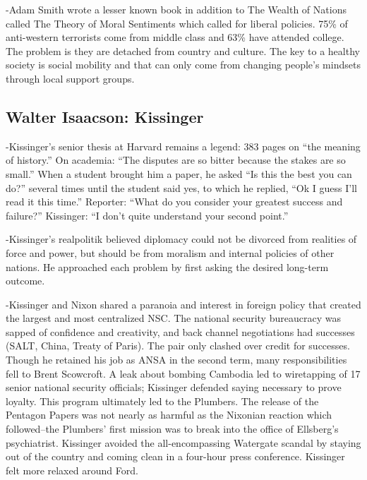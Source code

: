 \documentclass[
]{article}
\begin{document}
-Adam Smith wrote a lesser known book in addition to The Wealth of
Nations called The Theory of Moral Sentiments which called for liberal
policies. 75\% of anti-western terrorists come from middle class and
63\% have attended college. The problem is they are detached from
country and culture. The key to a healthy society is social mobility and
that can only come from changing people's mindsets through local support
groups.

\hypertarget{walter-isaacson-kissinger}{%
\subsection{Walter Isaacson:
Kissinger}\label{walter-isaacson-kissinger}}

-Kissinger's senior thesis at Harvard remains a legend: 383 pages on
``the meaning of history.'' On academia: ``The disputes are so bitter
because the stakes are so small.'' When a student brought him a paper,
he asked ``Is this the best you can do?'' several times until the
student said yes, to which he replied, ``Ok I guess I'll read it this
time.'' Reporter: ``What do you consider your greatest success and
failure?'' Kissinger: ``I don't quite understand your second point.''

-Kissinger's realpolitik believed diplomacy could not be divorced from
realities of force and power, but should be from moralism and internal
policies of other nations. He approached each problem by first asking
the desired long-term outcome.

-Kissinger and Nixon shared a paranoia and interest in foreign policy
that created the largest and most centralized NSC. The national security
bureaucracy was sapped of confidence and creativity, and back channel
negotiations had successes (SALT, China, Treaty of Paris). The pair only
clashed over credit for successes. Though he retained his job as ANSA in
the second term, many responsibilities fell to Brent Scowcroft. A leak
about bombing Cambodia led to wiretapping of 17 senior national security
officials; Kissinger defended saying necessary to prove loyalty. This
program ultimately led to the Plumbers. The release of the Pentagon
Papers was not nearly as harmful as the Nixonian reaction which
followed--the Plumbers' first mission was to break into the office of
Ellsberg's psychiatrist. Kissinger avoided the all-encompassing
Watergate scandal by staying out of the country and coming clean in a
four-hour press conference. Kissinger felt more relaxed around Ford.
\end{document}
